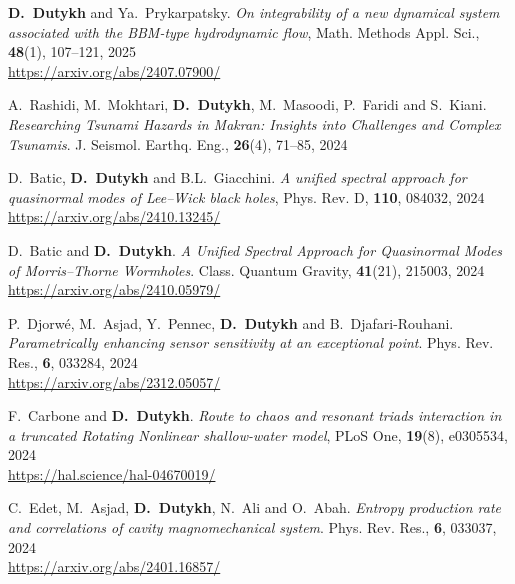 \begin{etaremune}
  \item \textbf{D.~Dutykh} and Ya.~Prykarpatsky. \textit{On integrability of a new dynamical system associated with the BBM-type hydrodynamic flow}, Math. Methods Appl. Sci., \textbf{48}(1), 107--121, 2025 \\ %
  \url{https://arxiv.org/abs/2407.07900/}



  \item A.~Rashidi, M.~Mokhtari, \textbf{D.~Dutykh}, M.~Masoodi, P.~Faridi and S.~Kiani. \textit{Researching Tsunami Hazards in Makran: Insights into Challenges and Complex Tsunamis}. J. Seismol. Earthq. Eng., \textbf{26}(4), 71--85, 2024 %

  \item D.~Batic, \textbf{D.~Dutykh} and B.L.~Giacchini. \textit{A unified spectral approach for quasinormal modes of Lee--Wick black holes}, Phys. Rev. D, \textbf{110}, 084032, 2024 \\ %
  \url{https://arxiv.org/abs/2410.13245/}

  \item D.~Batic and \textbf{D.~Dutykh}. \textit{A Unified Spectral Approach for Quasinormal Modes of Morris--Thorne Wormholes}. Class. Quantum Gravity, \textbf{41}(21), 215003, 2024 \\ %
  \url{https://arxiv.org/abs/2410.05979/}

  \item P.~Djorw\'e, M.~Asjad, Y.~Pennec, \textbf{D.~Dutykh} and B.~Djafari-Rouhani. \textit{Parametrically enhancing sensor sensitivity at an exceptional point}. Phys. Rev. Res., \textbf{6}, 033284, 2024 \\ %
  \url{https://arxiv.org/abs/2312.05057/}
  
  \item F.~Carbone and \textbf{D.~Dutykh}. \textit{Route to chaos and resonant triads interaction in a truncated Rotating Nonlinear shallow-water model}, PLoS One, \textbf{19}(8), e0305534, 2024 \\ %
  \url{https://hal.science/hal-04670019/}

  \item C.~Edet, M.~Asjad, \textbf{D.~Dutykh}, N.~Ali and O.~Abah. \textit{Entropy production rate and correlations of cavity magnomechanical system}. Phys. Rev. Res., \textbf{6}, 033037, 2024 \\ %
  \url{https://arxiv.org/abs/2401.16857/}


\end{etaremune}
